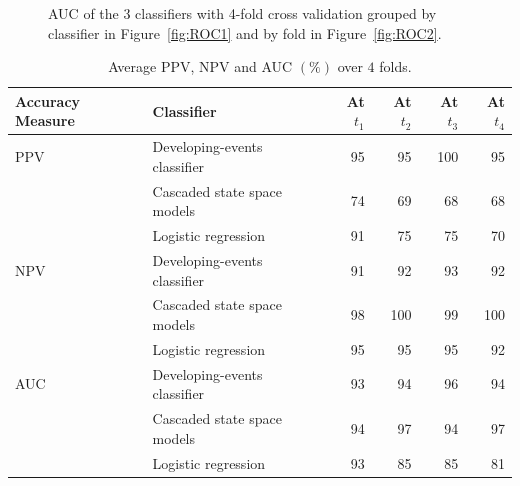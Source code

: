 \documentclass[a4paper,11pt]{article}
\begin{document}
\begin{figure}
	\centering
	\caption{AUC of the 3 classifiers with 4-fold cross validation grouped by classifier in Figure~\ref{fig:ROC1} and by fold in Figure~\ref{fig:ROC2}.}
	\label{fig:RealROC}
\end{figure}

\begin{table}
	\centering
	\begin{tabular}{llrrrr}
		\toprule
		Accuracy Measure & Classifier                   & At $t_1$ & At $t_2$ & At $t_3$ & At $t_4$ \\
		\midrule
		PPV              & Developing-events classifier & 95       & 95       & 100      & 95       \\
		                 & Cascaded state space models  & 74       & 69       & 68       & 68       \\
		                 & Logistic regression          & 91       & 75       & 75       & 70       \\
		\hline
		NPV              & Developing-events classifier & 91       & 92       & 93       & 92       \\
		                 & Cascaded state space models  & 98       & 100      & 99       & 100      \\
		                 & Logistic regression          & 95       & 95       & 95       & 92       \\
		\hline
		AUC              & Developing-events classifier & 93       & 94       & 96       & 94       \\
		                 & Cascaded state space models  & 94       & 97       & 94       & 97       \\
		                 & Logistic regression          & 93       & 85       & 85       & 81       \\
		\bottomrule
	\end{tabular}
	 \caption{Average PPV, NPV and AUC $(\%)$ over $4$ folds.}\label{tab:AverageAccuracyReal}
\end{table}
\end{document}
